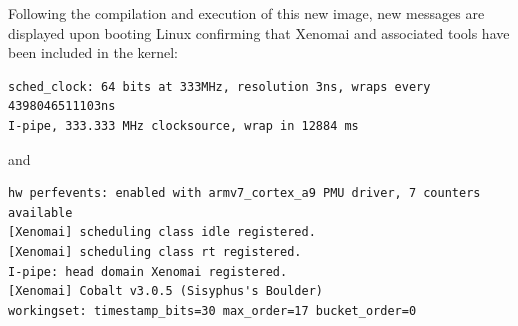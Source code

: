 \documentclass{article}
\begin{document}
{{%

Following the compilation and execution of this new image, new messages are displayed upon
booting Linux confirming that Xenomai and associated tools have been included in the kernel:
\begin{verbatim}
sched_clock: 64 bits at 333MHz, resolution 3ns, wraps every 4398046511103ns
I-pipe, 333.333 MHz clocksource, wrap in 12884 ms
\end{verbatim}
and
\begin{verbatim}
hw perfevents: enabled with armv7_cortex_a9 PMU driver, 7 counters available
[Xenomai] scheduling class idle registered.
[Xenomai] scheduling class rt registered.
I-pipe: head domain Xenomai registered.
[Xenomai] Cobalt v3.0.5 (Sisyphus's Boulder) 
workingset: timestamp_bits=30 max_order=17 bucket_order=0
\end{verbatim}

}}
\end{document}
